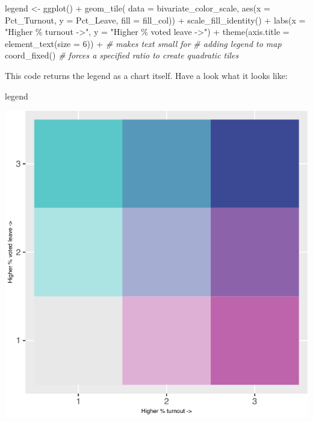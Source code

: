 \documentclass[
  krantz2]{krantz}
\makeatletter
\newenvironment{Shaded}{\begin{snugshade}}{\end{snugshade}}
\newcommand{\AttributeTok}[1]{\textcolor[rgb]{0.61,0.61,0.61}{#1}}
\newcommand{\CommentTok}[1]{\textcolor[rgb]{0.37,0.37,0.37}{\textit{#1}}}
\newcommand{\DecValTok}[1]{\textcolor[rgb]{0.06,0.06,0.06}{#1}}
\newcommand{\FunctionTok}[1]{\textcolor[rgb]{0,0,0}{#1}}
\newcommand{\NormalTok}[1]{#1}
\newcommand{\OtherTok}[1]{\textcolor[rgb]{0.37,0.37,0.37}{#1}}
\newcommand{\SpecialCharTok}[1]{\textcolor[rgb]{0,0,0}{#1}}
\newcommand{\StringTok}[1]{\textcolor[rgb]{0.5,0.5,0.5}{#1}}
\newenvironment{kframe}{%
\medskip{}
\setlength{\fboxsep}{.8em}
 \def\at@end@of@kframe{}%
 \ifinner\ifhmode%
  \def\at@end@of@kframe{\end{minipage}}%
  \begin{minipage}{\columnwidth}%
 \fi\fi%
 \def\FrameCommand##1{\hskip\@totalleftmargin \hskip-\fboxsep
 \colorbox{shadecolor}{##1}\hskip-\fboxsep
     \hskip-\linewidth \hskip-\@totalleftmargin \hskip\columnwidth}%
 \MakeFramed {\advance\hsize-\width
   \@totalleftmargin\z@ \linewidth\hsize
   \@setminipage}}%
 {\par\unskip\endMakeFramed%
 \at@end@of@kframe}
\renewenvironment{Shaded}{\begin{kframe}}{\end{kframe}}
\makeatother
\begin{document}
\begin{Shaded}
\begin{Highlighting}[]
\NormalTok{legend }\OtherTok{\textless{}{-}} \FunctionTok{ggplot}\NormalTok{() }\SpecialCharTok{+}
  \FunctionTok{geom\_tile}\NormalTok{( }\AttributeTok{data =}\NormalTok{ bivariate\_color\_scale, }
             \FunctionTok{aes}\NormalTok{(}\AttributeTok{x =}\NormalTok{ Pct\_Turnout, }\AttributeTok{y =}\NormalTok{ Pct\_Leave, }\AttributeTok{fill =}\NormalTok{ fill\_col)) }\SpecialCharTok{+}
  \FunctionTok{scale\_fill\_identity}\NormalTok{() }\SpecialCharTok{+}
  \FunctionTok{labs}\NormalTok{(}\AttributeTok{x =} \StringTok{"Higher \% turnout {-}\textgreater{}"}\NormalTok{,}
       \AttributeTok{y =} \StringTok{"Higher \% voted leave {-}\textgreater{}"}\NormalTok{) }\SpecialCharTok{+}
  \FunctionTok{theme}\NormalTok{(}\AttributeTok{axis.title =} \FunctionTok{element\_text}\NormalTok{(}\AttributeTok{size =} \DecValTok{6}\NormalTok{)) }\SpecialCharTok{+} \CommentTok{\# makes text small for }
                                               \CommentTok{\# adding legend to map}
  \FunctionTok{coord\_fixed}\NormalTok{()  }\CommentTok{\# forces a specified ratio to create quadratic tiles}
\end{Highlighting}
\end{Shaded}

This code returns the legend as a chart itself. Have a look what it looks like:

\begin{Shaded}
\begin{Highlighting}[]
\NormalTok{legend}
\end{Highlighting}
\end{Shaded}

\includegraphics{crime_mapping_files/figure-latex/unnamed-chunk-149-1.pdf}
\end{document}
